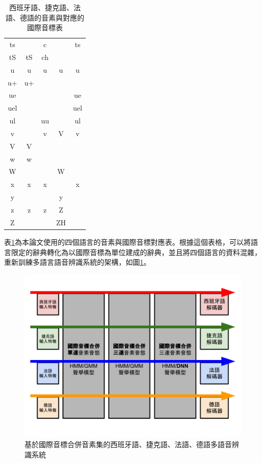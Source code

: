 \begin{table}
\begin{tabular}{|c|cccc|}
  ts  &     &  c  &     &  ts \\
  tS  &  tS & ch  &     &     \\
  u   &  u  &  u  & u   &   u \\
  u+  &  u+ &     &     &     \\
  ue  &     &     &     &  ue \\
  uel &     &     &     & uel \\
  ul  &     & uu  &     &  ul \\
  v   &     &  v  & V   &   v \\
  V   &  V  &     &     &     \\
  w   &  w  &     &     &     \\
  W   &     &     & W   &     \\
  x   &  x  &  x  &     &   x \\
  y   &     &     & y   &     \\
  z   &  z  &  z  & Z   &     \\
  Z   &     &     & ZH  &     \\
\hline
\end{tabular}
\caption{西班牙語、捷克語、法語、德語的音素與對應的國際音標表}
\label{table:GP_IPA_mapping}
\end{table}

表\ref{table:GP_IPA_mapping}為本論文使用的四個語言的音素與國際音標對應表。根據這個表格，可以將語言限定的辭典轉化為以國際音標為單位建成的辭典，並且將四個語言的資料混雜，重新訓練多語言語音辨識系統的架構，如圖\ref{fig:chap4_IPA_merged}。

\begin{figure}[!h]
\centering
\includegraphics[scale=0.4]{images/chap4_IPA_merged.png}
\caption{基於國際音標合併音素集的西班牙語、捷克語、法語、德語多語音辨識系統}
\label{fig:chap4_IPA_merged}
\end{figure}

